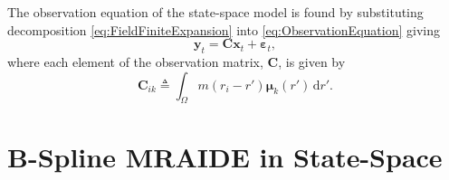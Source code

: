 \documentclass[11pt,draftcls,onecolumn,peerreview]{IEEEtran}
\begin{document}

The observation equation of the state-space model is found by substituting decomposition \eqref{eq:FieldFiniteExpansion}
 into \eqref{eq:ObservationEquation} giving
\begin{equation}\label{eq:ReducedObservationEquation} 
	\mathbf{y}_t = \mathbf{C}\mathbf{x}_t + \boldsymbol{\varepsilon}_t,
\end{equation}
where each element of the observation matrix, $\mathbf{C}$, is given by
\begin{equation}\label{eq:Observationmatrix}
	\mathbf{C}_{ik} \triangleq \int_{\Omega}m(r_i -r')\boldsymbol{\mu}_k(r') \, \mathrm{d}r'.
\end{equation}

\section{B-Spline MRAIDE in State-Space }
\end{document}
